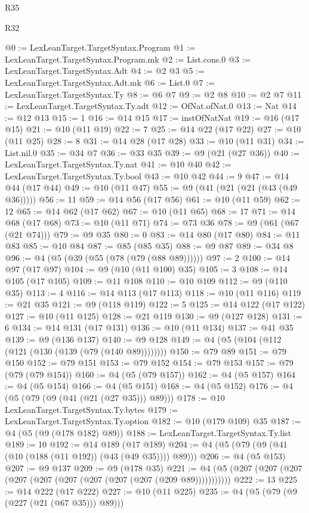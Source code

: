 \begin{lexlean}{R35}
\begin{lexlean}{R32}
\begin{coremodule}
{{{{{{{{{{{{{{{{{{{{{{{{{{{{{{{{{{{{{{{{{{{{{{{{{{{@0 := LexLeanTarget.TargetSyntax.Program
@1 := LexLeanTarget.TargetSyntax.Program.mk
@2 := List.cons.{0}
@3 := LexLeanTarget.TargetSyntax.Adt
@4 := @2 @3
@5 := LexLeanTarget.TargetSyntax.Adt.mk
@6 := List.{0}
@7 := LexLeanTarget.TargetSyntax.Ty
@8 := @6 @7
@9 := @2 @8
@10 := @2 @7
@11 := LexLeanTarget.TargetSyntax.Ty.adt
@12 := OfNat.ofNat.{0}
@13 := Nat
@14 := @12 @13
@15 := 1
@16 := @14 @15
@17 := instOfNatNat
@19 := @16 (@17 @15)
@21 := @10 (@11 @19)
@22 := 7
@25 := @14 @22 (@17 @22)
@27 := @10 (@11 @25)
@28 := 8
@31 := @14 @28 (@17 @28)
@33 := @10 (@11 @31)
@34 := List.nil.{0}
@35 := @34 @7
@36 := @33 @35
@39 := @9 (@21 (@27 @36))
@40 := LexLeanTarget.TargetSyntax.Ty.nat
@41 := @10 @40
@42 := LexLeanTarget.TargetSyntax.Ty.bool
@43 := @10 @42
@44 := 9
@47 := @14 @44 (@17 @44)
@49 := @10 (@11 @47)
@55 := @9 (@41 (@21 (@21 (@43 (@49 @36)))))
@56 := 11
@59 := @14 @56 (@17 @56)
@61 := @10 (@11 @59)
@62 := 12
@65 := @14 @62 (@17 @62)
@67 := @10 (@11 @65)
@68 := 17
@71 := @14 @68 (@17 @68)
@73 := @10 (@11 @71)
@74 := @73 @36
@78 := @9 (@61 (@67 (@21 @74)))
@79 := @9 @35
@80 := 0
@83 := @14 @80 (@17 @80)
@84 := @11 @83
@85 := @10 @84
@87 := @85 (@85 @35)
@88 := @9 @87
@89 := @34 @8
@96 := @4 (@5 (@39 (@55 (@78 (@79 (@88 @89))))))
@97 := 2
@100 := @14 @97 (@17 @97)
@104 := @9 (@10 (@11 @100) @35)
@105 := 3
@108 := @14 @105 (@17 @105)
@109 := @11 @108
@110 := @10 @109
@112 := @9 (@110 @35)
@113 := 4
@116 := @14 @113 (@17 @113)
@118 := @10 (@11 @116)
@119 := @21 @35
@121 := @9 (@118 @119)
@122 := 5
@125 := @14 @122 (@17 @122)
@127 := @10 (@11 @125)
@128 := @21 @119
@130 := @9 (@127 @128)
@131 := 6
@134 := @14 @131 (@17 @131)
@136 := @10 (@11 @134)
@137 := @41 @35
@139 := @9 (@136 @137)
@140 := @9 @128
@149 := @4 (@5 (@104 (@112 (@121 (@130 (@139 (@79 (@140 @89))))))))
@150 := @79 @89
@151 := @79 @150
@152 := @79 @151
@153 := @79 @152
@154 := @79 @153
@157 := @79 (@79 (@79 @154))
@160 := @4 (@5 (@79 @157))
@162 := @4 (@5 @157)
@164 := @4 (@5 @154)
@166 := @4 (@5 @151)
@168 := @4 (@5 @152)
@176 := @4 (@5 (@79 (@9 (@41 (@21 (@27 @35))) @89)))
@178 := @10 LexLeanTarget.TargetSyntax.Ty.bytes
@179 := LexLeanTarget.TargetSyntax.Ty.option
@182 := @10 (@179 @109) @35
@187 := @4 (@5 (@9 (@178 @182) @89))
@188 := LexLeanTarget.TargetSyntax.Ty.list
@189 := 10
@192 := @14 @189 (@17 @189)
@204 := @4 (@5 (@79 (@9 (@41 (@10 (@188 (@11 @192)) (@43 (@49 @35)))) @89)))
@206 := @4 (@5 @153)
@207 := @9 @137
@209 := @9 (@178 @35)
@221 := @4 (@5 (@207 (@207 (@207 (@207 (@207 (@207 (@207 (@207 (@207 (@209 @89)))))))))))
@222 := 13
@225 := @14 @222 (@17 @222)
@227 := @10 (@11 @225)
@235 := @4 (@5 (@79 (@9 (@227 (@21 (@67 @35))) @89)))
}}}}}}}}}}}}}}}}}}}}}}}}}}}}}}}}}}}}}}}}}}}}}}}}}}}
\end{coremodule}
\end{lexlean}
\end{lexlean}
